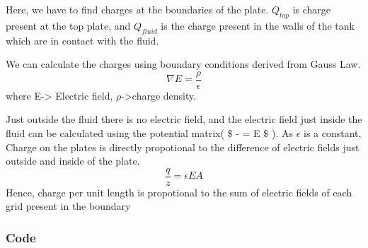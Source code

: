 \documentclass[11pt]{article}
\begin{document}
Here, we have to find charges at the boundaries of the plate.
\(Q_{top}\) is charge present at the top plate, and \(Q_{fluid}\) is the
charge present in the walls of the tank which are in contact with the
fluid.

We can calculate the charges using boundary conditions derived from
Gauss Law. \[ \nabla E = \frac{\rho}{\epsilon} \] where E-\textgreater{}
Electric field, \(\rho\)-\textgreater{}charge density.

Just outside the fluid there is no electric field, and the electric
field just inside the fluid can be calculated using the potential
matrix( \$ -  = E \$ ). As \(\epsilon\) is a constant,
Charge on the plates is directly propotional to the difference of
electric fields just outside and inside of the plate.
\[ \frac{q}{z} = \epsilon EA \] Hence, charge per unit length is
propotional to the sum of electric fields of each grid present in the
boundary

    \hypertarget{code}{%
\subsubsection{Code}\label{code}}
\end{document}
